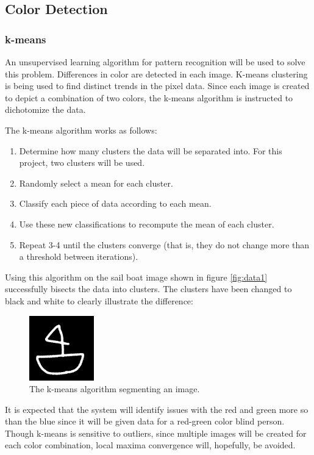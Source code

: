 \documentclass[12pt]{article}
\begin{document}
\subsection{Color Detection}
\subsubsection{k-means}
An unsupervised learning algorithm for pattern recognition will be used to solve this problem. Differences in color are detected in each image. K-means clustering is being used to find distinct trends in the pixel data. Since each image is created to depict a combination of two colors, the k-means algorithm is instructed to dichotomize the data.

The k-means algorithm works as follows:
\singlespacing
\begin{enumerate}
\item Determine how many clusters the data will be separated into. For this project, two clusters will be used.
\item Randomly select a mean for each cluster.
\item Classify each piece of data according to each mean.
\item Use these new classifications to recompute the mean of each cluster.
\item Repeat 3-4 until the clusters converge (that is, they do not change more than a threshold between iterations).
\end{enumerate}
\doublespacing
Using this algorithm on the sail boat image shown in figure \ref{fig:data1} successfully bisects the data into clusters. The clusters have been changed to black and white to clearly illustrate the difference:

\begin{figure}[H]
	\centering
	\includegraphics[width=0.25\textwidth]{img/data2_bw.png}
	\caption{The k-means algorithm segmenting an image.}
	\label{fig:kmeans1}
\end{figure}

It is expected that the system will identify issues with the red and green more so than the blue since it will be given data for a red-green color blind person. Though k-means is sensitive to outliers, since multiple images will be created for each color combination, local maxima convergence will, hopefully, be avoided. 
\end{document}
